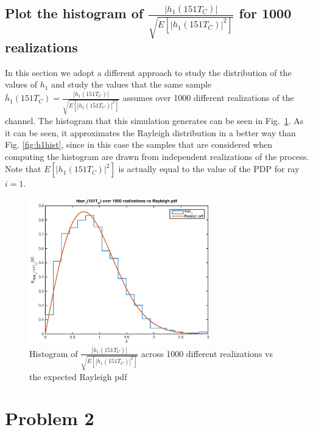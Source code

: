 \documentclass[10pt]{article}
\begin{document}
\subsection*{Plot the histogram of $\frac{|h_1(151T_C)|}{\sqrt{E[|h_1(151T_C)|^2]}}$ for 1000 realizations}
In this section we adopt a different approach to study the distribution of the values of $h_1$ and study the values that the same sample $\bar{h}_1(151T_C) = \frac{|h_1(151T_C)|}{\sqrt{E[|h_1(151T_C)|^2]}}$ assumes over 1000 different realizations of the channel. The histogram that this simulation generates can be seen in Fig.~\ref{fig:h1hist1000realizations}. As it can be seen, it approximates the Rayleigh distribution in a better way than Fig. \ref{fig:h1hist}, since in this case the samples that are considered when computing the histogram are drawn from independent realizations of the process. Note that $E[|h_1(151T_C)|^2]$ is actually equal to the value of the PDP for ray $i=1$.

\begin{figure}[h!]
  \centering
  \includegraphics[width = 0.7\textwidth]{p03_h1hist}
  \caption{Histogram of $\frac{|h_1(151T_C)|}{\sqrt{E[|h_1(151T_C)|^2]}}$ across 1000 different realizations vs the expected Rayleigh pdf}
  \label{fig:h1hist1000realizations}
\end{figure}


\clearpage

\section*{Problem 2}
\end{document}
